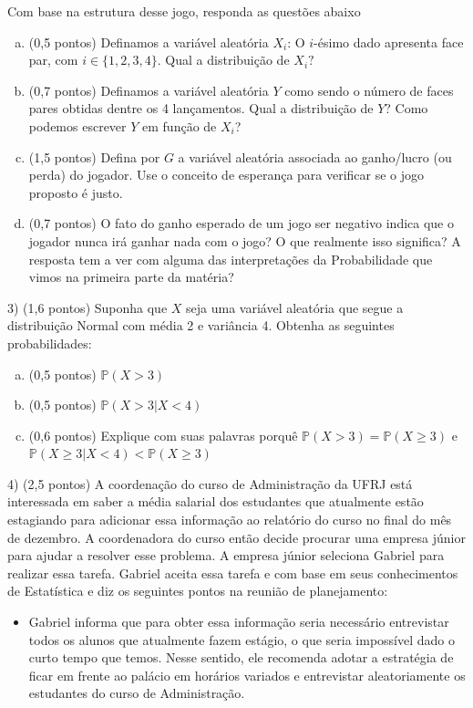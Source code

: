 \documentclass[12pt]{article}
\begin{document}
Com base na estrutura desse jogo, responda as questões abaixo
\begin{enumerate}[a)]
    \item (0,5 pontos) Definamos a variável aleatória $X_i$: O $i$-ésimo dado apresenta face par, com $i \in \{1,2,3,4\}$. Qual a distribuição de $X_i?$
    \item (0,7 pontos) Definamos a variável aleatória $Y$ como sendo o número de faces pares obtidas dentre os 4 lançamentos. Qual a distribuição de $Y$? Como podemos escrever $Y$ em função de $X_i$?
    \item (1,5 pontos) Defina por $G$ a variável aleatória associada ao ganho/lucro (ou perda) do jogador. Use o conceito de esperança para verificar se o jogo proposto é justo. 
    \item (0,7 pontos) O fato do ganho esperado de um jogo ser negativo indica que o jogador nunca irá ganhar nada com o jogo? 
        O que realmente isso significa? A resposta tem a ver com alguma das interpretações da Probabilidade que vimos na primeira parte da matéria?
    \end{enumerate}


3) (1,6 pontos) Suponha que $X$ seja uma variável aleatória que segue a distribuição Normal com média 2 e variância 4. Obtenha as seguintes probabilidades:
\begin{enumerate}[a)]
    \item (0,5 pontos) $\mathds{P}(X > 3)$
    \item (0,5 pontos) $ \mathds{P}(X > 3 | X < 4)$
    \item (0,6 pontos) Explique com suas palavras porquê $\mathds{P}(X > 3) = \mathds{P}(X \geq 3)$ e $\mathds{P}(X\geq 3 | X < 4) <  \mathds{P}(X\geq 3 )$ 
\end{enumerate}

4) (2,5 pontos) A coordenação do curso de Administração da UFRJ está interessada em saber a média salarial dos estudantes que atualmente estão estagiando para 
adicionar essa informação ao relatório do curso no final do mês de dezembro. 
A coordenadora do curso então decide procurar uma empresa júnior para ajudar a resolver esse problema. A empresa júnior seleciona Gabriel para 
realizar essa tarefa. Gabriel aceita essa tarefa e com base em seus conhecimentos de Estatística e diz os seguintes pontos na reunião de planejamento:

\begin{itemize}
    \item Gabriel informa que para obter essa informação seria necessário entrevistar todos os alunos que atualmente fazem estágio, o que seria 
    impossível dado o curto tempo que temos. Nesse sentido, ele recomenda adotar a estratégia de ficar em frente ao palácio em horários variados e entrevistar 
    aleatoriamente os estudantes do curso de Administração.  
\end{itemize}
\end{document}

